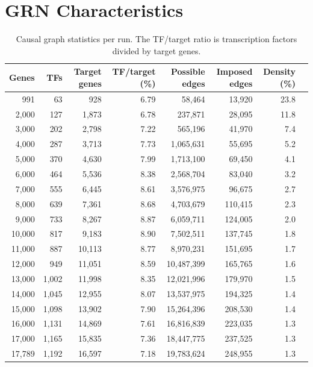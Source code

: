 \documentclass[11pt]{article}
\begin{document}
\section{GRN Characteristics}
\begin{table}[H]
\centering
\small
\caption{Causal graph statistics per run. The TF/target ratio is transcription factors divided by target genes.}
\label{tab:grn}
\begin{tabular}{rrrrrrrr}
\toprule
Genes & TFs & Target genes & TF/target (\%) & Possible edges & Imposed edges & Density (\%) \\
\midrule
991 & 63 & 928 & 6.79 & 58,464 & 13,920 & 23.8\\
2,000 & 127 & 1,873 & 6.78 & 237,871 & 28,095 & 11.8\\
3,000 & 202 & 2,798 & 7.22 & 565,196 & 41,970 & 7.4\\
4,000 & 287 & 3,713 & 7.73 & 1,065,631 & 55,695 & 5.2\\
5,000 & 370 & 4,630 & 7.99 & 1,713,100 & 69,450 & 4.1\\
6,000 & 464 & 5,536 & 8.38 & 2,568,704 & 83,040 & 3.2\\
7,000 & 555 & 6,445 & 8.61 & 3,576,975 & 96,675 & 2.7\\
8,000 & 639 & 7,361 & 8.68 & 4,703,679 & 110,415 & 2.3\\
9,000 & 733 & 8,267 & 8.87 & 6,059,711 & 124,005 & 2.0\\
10,000 & 817 & 9,183 & 8.90 & 7,502,511 & 137,745 & 1.8\\
11,000 & 887 & 10,113 & 8.77 & 8,970,231 & 151,695 & 1.7\\
12,000 & 949 & 11,051 & 8.59 & 10,487,399 & 165,765 & 1.6\\
13,000 & 1,002 & 11,998 & 8.35 & 12,021,996 & 179,970 & 1.5\\
14,000 & 1,045 & 12,955 & 8.07 & 13,537,975 & 194,325 & 1.4\\
15,000 & 1,098 & 13,902 & 7.90 & 15,264,396 & 208,530 & 1.4\\
16,000 & 1,131 & 14,869 & 7.61 & 16,816,839 & 223,035 & 1.3\\
17,000 & 1,165 & 15,835 & 7.36 & 18,447,775 & 237,525 & 1.3\\
17,789 & 1,192 & 16,597 & 7.18 & 19,783,624 & 248,955 & 1.3\\
\bottomrule
\end{tabular}
\end{table}
\end{document}
